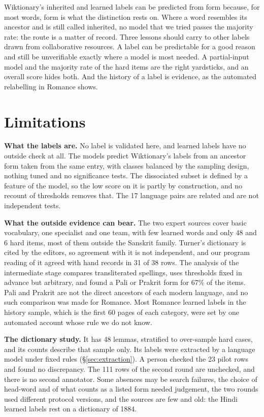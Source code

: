 \documentclass[11pt]{article}
\begin{document}
Wiktionary's inherited and learned labels can be predicted from form because, for most words, form is what the distinction rests on. Where a word resembles its ancestor and is still called inherited, no model that we tried passes the majority rate: the route is a matter of record. Three lessons should carry to other labels drawn from collaborative resources. A label can be predictable for a good reason and still be unverifiable exactly where a model is most needed. A partial-input model and the majority rate of the hard items are the right yardsticks, and an overall score hides both. And the history of a label is evidence, as the automated relabelling in Romance shows.

\section*{Limitations}

\textbf{What the labels are.} No label is validated here, and learned labels have no outside check at all. The models predict Wiktionary's labels from an ancestor form taken from the same entry, with classes balanced by the sampling design, nothing tuned and no significance tests. The dissociated subset is defined by a feature of the model, so the low score on it is partly by construction, and no recount of thresholds removes that. The 17 language pairs are related and are not independent tests.

\textbf{What the outside evidence can bear.} The two expert sources cover basic vocabulary, one specialist and one team, with few learned words and only 48 and 6 hard items, most of them outside the Sanskrit family. Turner's dictionary is cited by the editors, so agreement with it is not independent, and our program reading of it agreed with hand records in 31 of 38 rows. The analysis of the intermediate stage compares transliterated spellings, uses thresholds fixed in advance but arbitrary, and found a Pali or Prakrit form for 67\% of the items. Pali and Prakrit are not the direct ancestors of each modern language, and no such comparison was made for Romance. Most Romance learned labels in the history sample, which is the first 60 pages of each category, were set by one automated account whose rule we do not know.

\textbf{The dictionary study.} It has 48 lemmas, stratified to over-sample hard cases, and its counts describe that sample only. Its labels were extracted by a language model under fixed rules (\S\ref{sec:extraction}). A person checked the 23 pilot rows and found no discrepancy. The 111 rows of the second round are unchecked, and there is no second annotator. Some absences may be search failures, the choice of head-word and of what counts as a listed form needed judgement, the two rounds used different protocol versions, and the sources are few and old: the Hindi learned labels rest on a dictionary of 1884.
\end{document}
